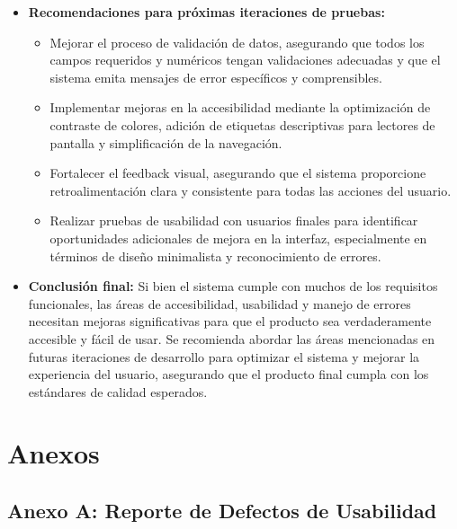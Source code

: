 \documentclass[stu, 12pt, letterpaper, donotrepeattitle, floatsintext, natbib]{apa7}
\begin{document}
\begin{itemize}
    \item \textbf{Recomendaciones para próximas iteraciones de pruebas:} 
    \begin{itemize}
        \item Mejorar el proceso de validación de datos, asegurando que todos los campos requeridos y numéricos tengan validaciones adecuadas y que el sistema emita mensajes de error específicos y comprensibles.
        \item Implementar mejoras en la accesibilidad mediante la optimización de contraste de colores, adición de etiquetas descriptivas para lectores de pantalla y simplificación de la navegación.
        \item Fortalecer el feedback visual, asegurando que el sistema proporcione retroalimentación clara y consistente para todas las acciones del usuario.
        \item Realizar pruebas de usabilidad con usuarios finales para identificar oportunidades adicionales de mejora en la interfaz, especialmente en términos de diseño minimalista y reconocimiento de errores.
    \end{itemize}

    \item \textbf{Conclusión final:} Si bien el sistema cumple con muchos de los requisitos funcionales, las áreas de accesibilidad, usabilidad y manejo de errores necesitan mejoras significativas para que el producto sea verdaderamente accesible y fácil de usar. Se recomienda abordar las áreas mencionadas en futuras iteraciones de desarrollo para optimizar el sistema y mejorar la experiencia del usuario, asegurando que el producto final cumpla con los estándares de calidad esperados.
\end{itemize}


\newpage
\section{\large Anexos}

\subsection{Anexo A: Reporte de Defectos de Usabilidad} \label{tab:reporte_usabilidad}
\end{document}
